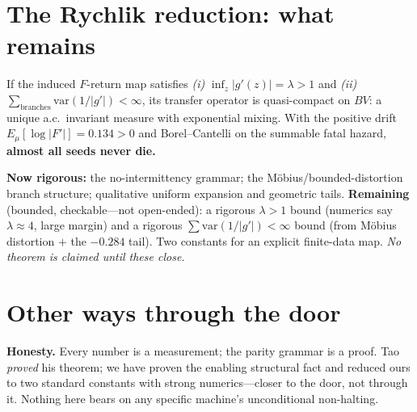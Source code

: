\documentclass[11pt]{article}
\begin{document}
\section{The Rychlik reduction: what remains}
\begin{theorem}
If the induced $F$-return map satisfies \emph{(i)} $\inf_z|g'(z)|=\lambda>1$ and \emph{(ii)} $\sum_{\text{branches}}\mathrm{var}(1/|g'|)<\infty$, its transfer operator is quasi-compact on $BV$: a unique a.c.\ invariant measure with exponential mixing. With the positive drift $E_\mu[\log|F'|]=0.134>0$ and Borel--Cantelli on the summable fatal hazard, \textbf{almost all seeds never die.}
\end{theorem}
\textbf{Now rigorous:} the no-intermittency grammar; the M\"obius/bounded-distortion branch structure; qualitative uniform expansion and geometric tails. \textbf{Remaining} (bounded, checkable---not open-ended): a rigorous $\lambda>1$ bound (numerics say $\lambda\!\approx\!4$, large margin) and a rigorous $\sum\mathrm{var}(1/|g'|)<\infty$ bound (from M\"obius distortion $+$ the $-0.284$ tail). Two constants for an explicit finite-data map. \emph{No theorem is claimed until these close.}

\section{Other ways through the door}
\begin{center}\end{center}

\noindent\textbf{Honesty.} Every number is a measurement; the parity grammar is a proof. Tao \emph{proved} his theorem; we have proven the enabling structural fact and reduced ours to two standard constants with strong numerics---closer to the door, not through it. Nothing here bears on any specific machine's unconditional non-halting.
\end{document}
